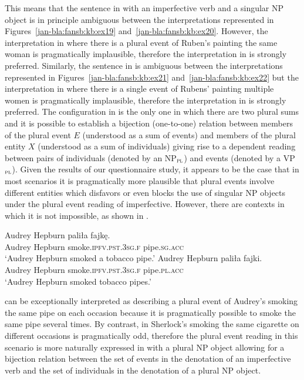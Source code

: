 \documentclass[output=paper]{langscibook}
\begin{document}
This means that the sentence in  with an imperfective verb and a singular NP object is in principle ambiguous between the interpretations represented in Figures~\ref{jan-bla:fansb:kb:ex19} and~\ref{jan-bla:fansb:kb:ex20}. However, the interpretation in  where there is a plural event of Ruben’s painting the same woman is pragmatically implausible, therefore the interpretation in  is strongly preferred. Similarly, the sentence in  is ambiguous between the interpretations represented in Figures~\ref{jan-bla:fansb:kb:ex21} and~\ref{jan-bla:fansb:kb:ex22} but the interpretation in  where there is a single event of Rubens’ painting multiple women is pragmatically implausible, therefore the interpretation in  is strongly preferred. The configuration in  is the only one in which there are two plural sums and it is possible to establish a bijection (one-to-one) relation between members of the plural event $E$ (understood as a sum of events) and members of the plural entity $X$ (understood as a sum of individuals) giving rise to a dependent reading between pairs of individuals (denoted by an NP$_\textsc{pl}$) and events (denoted by a VP$_\textsc{pl}$). Given the results of our questionnaire study, it appears to be the case that in most scenarios it is pragmatically more plausible that plural events involve different entities which disfavors or even blocks the use of singular NP objects under the plural event reading of imperfective. However, there are contexts in which it is not impossible, as shown in .

\ea\label{jan-bla:fansb:kb:ex23}
\gll Audrey Hepburn paliła fajkę.\\  
     Audrey Hepburn smoke.\textsc{ipfv.pst.3sg.f} pipe.\textsc{sg.acc}\\
\glt ‘Audrey Hepburn smoked a tobacco pipe.’
\ex\label{jan-bla:fansb:kb:ex24}
\gll Audrey Hepburn paliła fajki.\\  
      Audrey Hepburn smoke.\textsc{ipfv}.\textsc{pst}.\textsc{3sg}.\textsc{f} pipe.\textsc{pl}.\textsc{acc}\\
\glt ‘Audrey Hepburn smoked tobacco pipes.’
\z

\noindent {} can be exceptionally interpreted as describing a plural event of Audrey’s smoking the same pipe on each occasion because it is pragmatically possible to smoke the same pipe several times. By contrast, in  Sherlock’s smoking the same cigarette on different occasions is pragmatically odd, therefore the plural event reading in this scenario is more naturally expressed in  with a plural NP object allowing for a bijection relation between the set of events in the denotation of an imperfective verb and the set of individuals in the denotation of a plural NP object.  
\end{document}
